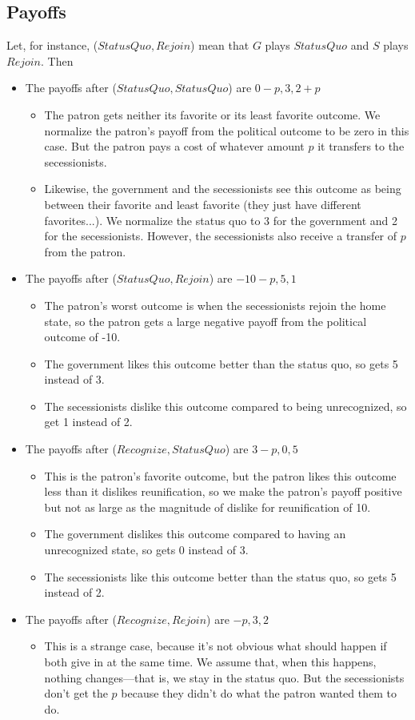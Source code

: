 \documentclass[12pt]{article}
\begin{document}
\subsection{Payoffs}
Let, for instance, ($Status Quo,Rejoin$) mean that $G$ plays $Status Quo$ and $S$ plays $Rejoin$. Then 
\begin{itemize}
	\item The payoffs after ($StatusQuo,StatusQuo$) are $0-p,3,2+p$
		\begin{itemize}
			\item The patron gets neither its favorite or its least favorite outcome. We normalize the patron's payoff from the political outcome to be zero in this case. But the patron pays a cost of whatever amount $p$ it transfers to the secessionists.
			\item Likewise, the government and the secessionists see this outcome as being between their favorite and least favorite (they just have different favorites...). We normalize the status quo to 3 for the government and 2 for the secessionists. However, the secessionists also receive a transfer of $p$ from the patron.
		\end{itemize}
	\item The payoffs after ($StatusQuo,Rejoin$) are $-10-p,5,1$
		\begin{itemize}
			\item The patron's worst outcome is when the secessionists rejoin the home state, so the patron gets a large negative payoff from the political outcome of -10.
			\item The government likes this outcome better than the status quo, so gets 5 instead of 3.
			\item The secessionists dislike this outcome compared to being unrecognized, so get 1 instead of 2.
		\end{itemize}
	\item The payoffs after ($Recognize,StatusQuo$) are $3-p,0,5$
		\begin{itemize}
			\item This is the patron's favorite outcome, but the patron likes this outcome less than it dislikes reunification, so we make the patron's payoff positive but not as large as the magnitude of dislike for reunification of 10.
			\item The government dislikes this outcome compared to having an unrecognized state, so gets 0 instead of 3.
			\item The secessionists like this outcome better than the status quo, so gets 5 instead of 2.
		\end{itemize}
	\item The payoffs after ($Recognize,Rejoin$) are $-p,3,2$
		\begin{itemize}
			\item This is a strange case, because it's not obvious what should happen if both give in at the same time. We assume that, when this happens, nothing changes---that is, we stay in the status quo. But the secessionists don't get the $p$ because they didn't do what the patron wanted them to do.
		\end{itemize}
\end{itemize}
\end{document}
